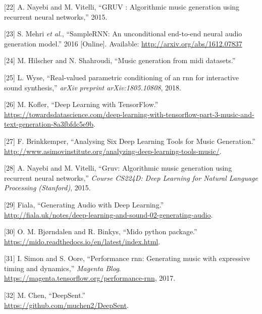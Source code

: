 \documentclass[12pt,]{article}
\begin{document}
\leavevmode\hypertarget{ref-Nayebi2015GRUVA}{}%
{[}22{]} A. Nayebi and M. Vitelli, ``GRUV : Algorithmic music generation
using recurrent neural networks,'' 2015.

\leavevmode\hypertarget{ref-mehri2016samplernn}{}%
{[}23{]} S. Mehri \emph{et al.}, ``SampleRNN: An unconditional
end-to-end neural audio generation model.'' 2016 {[}Online{]}.
Available: \url{http://arxiv.org/abs/1612.07837}

\leavevmode\hypertarget{ref-hilschermusic}{}%
{[}24{]} M. Hilscher and N. Shahroudi, ``Music generation from midi
datasets.''

\leavevmode\hypertarget{ref-wyse2018real}{}%
{[}25{]} L. Wyse, ``Real-valued parametric conditioning of an rnn for
interactive sound synthesis,'' \emph{arXiv preprint arXiv:1805.10808},
2018.

\leavevmode\hypertarget{ref-mkofler}{}%
{[}26{]} M. Kofler, ``Deep Learning with TensorFlow.'' \\
\url{https://towardsdatascience.com/deep-learning-with-tensorflow-part-3-music-and-text-generation-8a3fbfdc5e9b}.

\leavevmode\hypertarget{ref-asimovinst}{}%
{[}27{]} F. Brinkkemper, ``Analysing Six Deep Learning Tools for Music
Generation.'' \\
\url{http://www.asimovinstitute.org/analyzing-deep-learning-tools-music/}.

\leavevmode\hypertarget{ref-nayebi2015gruv}{}%
{[}28{]} A. Nayebi and M. Vitelli, ``Gruv: Algorithmic music generation
using recurrent neural networks,'' \emph{Course CS224D: Deep Learning
for Natural Language Processing (Stanford)}, 2015.

\leavevmode\hypertarget{ref-fiala}{}%
{[}29{]} \relax Fiala, ``Generating Audio with Deep Learning.'' \\
\url{http://fiala.uk/notes/deep-learning-and-sound-02-generating-audio}.

\leavevmode\hypertarget{ref-mido}{}%
{[}30{]} O. M. Bjørndalen and R. Binkys, ``Mido python package.'' \\
\url{https://mido.readthedocs.io/en/latest/index.html}.

\leavevmode\hypertarget{ref-performance-rnn-2017}{}%
{[}31{]} I. Simon and S. Oore, ``Performance rnn: Generating music with
expressive timing and dynamics,'' \emph{Magenta Blog}.
\url{https://magenta.tensorflow.org/performance-rnn}, 2017.

\leavevmode\hypertarget{ref-deepsent}{}%
{[}32{]} M. Chen, ``DeepSent.'' \\
\url{https://github.com/muchen2/DeepSent}.
\end{document}
